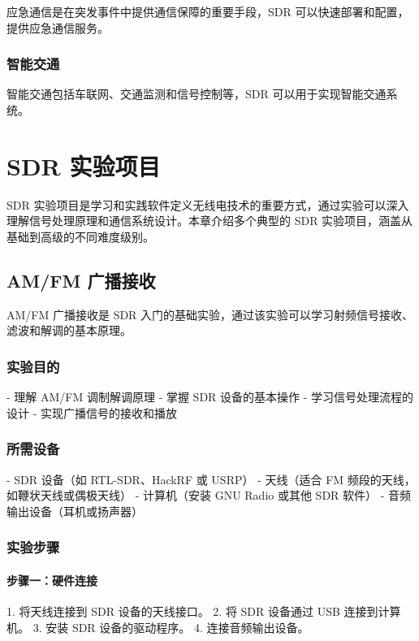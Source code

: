 \documentclass[UTF8]{ctexbook}
\begin{document}
应急通信是在突发事件中提供通信保障的重要手段，SDR 可以快速部署和配置，提供应急通信服务。

\subsection{智能交通}

智能交通包括车联网、交通监测和信号控制等，SDR 可以用于实现智能交通系统。

\chapter{SDR 实验项目}

SDR 实验项目是学习和实践软件定义无线电技术的重要方式，通过实验可以深入理解信号处理原理和通信系统设计。本章介绍多个典型的 SDR 实验项目，涵盖从基础到高级的不同难度级别。

\section{AM/FM 广播接收}

AM/FM 广播接收是 SDR 入门的基础实验，通过该实验可以学习射频信号接收、滤波和解调的基本原理。

\subsection{实验目的}

- 理解 AM/FM 调制解调原理
- 掌握 SDR 设备的基本操作
- 学习信号处理流程的设计
- 实现广播信号的接收和播放

\subsection{所需设备}

- SDR 设备（如 RTL-SDR、HackRF 或 USRP）
- 天线（适合 FM 频段的天线，如鞭状天线或偶极天线）
- 计算机（安装 GNU Radio 或其他 SDR 软件）
- 音频输出设备（耳机或扬声器）

\subsection{实验步骤}

\subsubsection{步骤一：硬件连接}

1. 将天线连接到 SDR 设备的天线接口。
2. 将 SDR 设备通过 USB 连接到计算机。
3. 安装 SDR 设备的驱动程序。
4. 连接音频输出设备。
\end{document}
